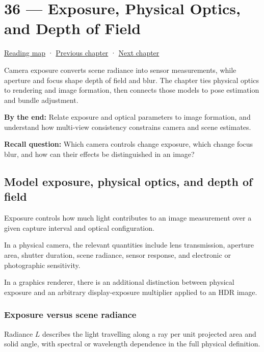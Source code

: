 \hypertarget{02-foundations-ii-ch036}{}
\chapter{36 --- Exposure, Physical Optics, and Depth of Field}\label{02-foundations-ii-ch036-exposure-physical-optics-and-depth-of-field}

\hyperref[volume-reading-map]{Reading map} · \hyperref[02-foundations-ii-ch035-camera-extrinsics-and-projection-geometry]{Previous chapter} · \hyperref[02-foundations-ii-ch037-camera-contracts-and-transform-chain-debugging]{Next chapter}

Camera exposure converts scene radiance into sensor measurements, while aperture and focus shape depth of field and blur. The chapter ties physical optics to rendering and image formation, then connects those models to pose estimation and bundle adjustment.

\textbf{By the end:} Relate exposure and optical parameters to image formation, and understand how multi-view consistency constrains camera and scene estimates.

\textbf{Recall question:} Which camera controls change exposure, which change focus blur, and how can their effects be distinguished in an image?

\section{Model exposure, physical optics, and depth of field}\label{02-foundations-ii-ch036-model-exposure-physical-optics-and-depth-of-field}

Exposure controls how much light contributes to an image measurement over a given capture interval and optical configuration.

In a physical camera, the relevant quantities include lens transmission, aperture area, shutter duration, scene radiance, sensor response, and electronic or photographic sensitivity.

In a graphics renderer, there is an additional distinction between physical exposure and an arbitrary display-exposure multiplier applied to an HDR image.

\subsection{Exposure versus scene radiance}\label{02-foundations-ii-ch036-exposure-versus-scene-radiance}

Radiance \(L\) describes the light travelling along a ray per unit projected area and solid angle, with spectral or wavelength dependence in the full physical definition.

